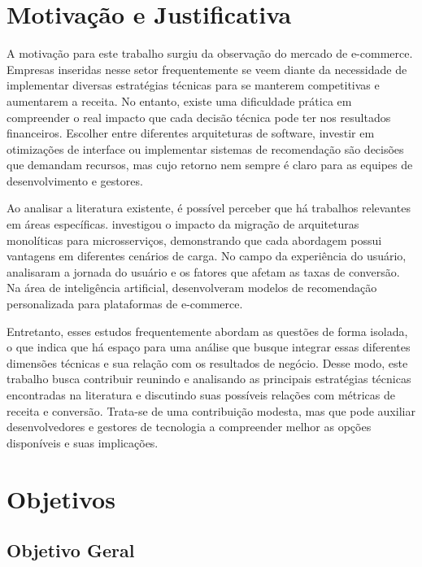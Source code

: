 \section{Motivação e Justificativa}

A motivação para este trabalho surgiu da observação do mercado de e-commerce. Empresas inseridas nesse setor frequentemente se veem diante da necessidade de implementar diversas estratégias técnicas para se manterem competitivas e aumentarem a receita. No entanto, existe uma dificuldade prática em compreender o real impacto que cada decisão técnica pode ter nos resultados financeiros. Escolher entre diferentes arquiteturas de software, investir em otimizações de interface ou implementar sistemas de recomendação são decisões que demandam recursos, mas cujo retorno nem sempre é claro para as equipes de desenvolvimento e gestores.

Ao analisar a literatura existente, é possível perceber que há trabalhos relevantes em áreas específicas. \cite{ubur_reviewing_2023} investigou o impacto da migração de arquiteturas monolíticas para microsserviços, demonstrando que cada abordagem possui vantagens em diferentes cenários de carga. No campo da experiência do usuário, \cite{muralidhar_clicks_2024} analisaram a jornada do usuário e os fatores que afetam as taxas de conversão. Na área de inteligência artificial, \cite{nguyen_personalized_2024} desenvolveram modelos de recomendação personalizada para plataformas de e-commerce.

Entretanto, esses estudos frequentemente abordam as questões de forma isolada, o que indica que há espaço para uma análise que busque integrar essas diferentes dimensões técnicas e sua relação com os resultados de negócio. Desse modo, este trabalho busca contribuir reunindo e analisando as principais estratégias técnicas encontradas na literatura e discutindo suas possíveis relações com métricas de receita e conversão. Trata-se de uma contribuição modesta, mas que pode auxiliar desenvolvedores e gestores de tecnologia a compreender melhor as opções disponíveis e suas implicações.

\section{Objetivos}

\subsection{Objetivo Geral}

